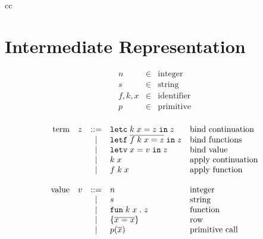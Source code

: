 \documentclass[11pt]{article}
\newcommand{\kw}[1]{\mathtt{#1}}
\begin{document}
\begin{rules}{cc}


\end{rules}

\newpage

\section{Intermediate Representation}

\newcommand{\appc}[2]{#1\;#2}
\newcommand{\appf}[3]{#1\;#2\;#3}
\newcommand{\letc}[4]{\kw{letc}\;#1\;#2 = #3\;\kw{in}\;#4}

\newcommand{\defterm}[4]{#1\;#2\;#3 = #4}
\newcommand{\letf}[2]{\kw{letf}\;\repo{#1}\;\kw{in}\;#2}
\newcommand{\letff}[2]{\kw{letf}\;#1\;\kw{in}\;#2}

\newcommand{\letv}[3]{\kw{letv}\;#1 = #2\;\kw{in}\;#3}

\newcommand{\funv}[3]{\kw{fun}\;#1\;#2\;.\;#3}
\newcommand{\intv}[1]{#1}
\newcommand{\prmv}[2]{#1(#2)}
\newcommand{\rowv}[2]{\{ \repo{#1 = #2} \}}
\newcommand{\rowvs}[2]{\{ #1 \}}
\newcommand{\strv}[1]{#1}

\newcommand{\andv}[2]{\kw{concat}\;#1\;#2}
\newcommand{\argv}[1]{\kw{argument}\;#1}
\newcommand{\capv}[2]{\kw{capability}\;#1\;#2}
\newcommand{\selv}[2]{\kw{select}\;#1\;#2}

\[
\begin{array}{lcl}
n & \in & \text{integer} \\
s & \in & \text{string} \\
f, k, x & \in & \text{identifier} \\
p & \in & \text{primitive} \\
\end{array}
\]

\[
\begin{array}{rlcll}
\text{term}
  & z & ::= & \letc{k}{x}{z}{z}              & \text{bind continuation} \\
  &   & |   & \letf{\defterm{f}{k}{x}{z}}{z} & \text{bind functions} \\
  &   & |   & \letv{x}{v}{z}                 & \text{bind value} \\
  &   & |   & \appc{k}{x}                    & \text{apply continuation} \\
  &   & |   & \appf{f}{k}{x}                 & \text{apply function} \\
\\
\text{value}
  & v & ::= & \intv{n}           & \text{integer}  \\
  &   & |   & \strv{s}           & \text{string} \\
  &   & |   & \funv{k}{x}{z}     & \text{function} \\
  &   & |   & \rowv{x}{x}        & \text{row} \\
  &   & |   & \prmv{p}{\repo{x}}  & \text{primitive call} \\
\end{array}
\]
\end{document}
